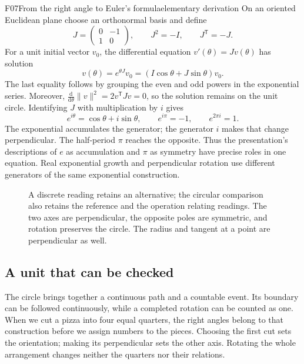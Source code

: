 \documentclass[11pt,a4paper]{article}
\begin{document}
\begin{formal}{F07}{From the right angle to Euler's formula}{elementary derivation}
On an oriented Euclidean plane choose an orthonormal basis and define
\begin{equation}
 J=\begin{pmatrix}0&-1\\1&0\end{pmatrix},\qquad
 J^2=-I,\qquad J^\mathsf{T}=-J.
\end{equation}
For a unit initial vector $v_0$, the differential equation
$v'(\theta)=Jv(\theta)$ has solution
\begin{equation}\label{eq:euler}
 v(\theta)=e^{\theta J}v_0
 = (I\cos\theta+J\sin\theta)v_0.
\end{equation}
The last equality follows by grouping the even and odd powers in the
exponential series. Moreover,
$\frac{\mathrm d}{\mathrm d\theta}\|v\|^2
=2v^\mathsf{T}Jv=0$, so the solution remains on the unit circle.
Identifying $J$ with multiplication by $i$ gives
\begin{equation}
 e^{i\theta}=\cos\theta+i\sin\theta,\qquad
 e^{i\pi}=-1,\qquad e^{2\pi i}=1.
\end{equation}
The exponential accumulates the generator; the generator $i$ makes that
change perpendicular. The half-period $\pi$ reaches the opposite. Thus the
presentation's descriptions of $e$ as accumulation and $\pi$ as symmetry have
precise roles in one equation. Real exponential growth and perpendicular
rotation use different generators of the same exponential construction.
\end{formal}

\begin{figure}[htbp]
\centering

\caption{A discrete reading retains an alternative; the circular comparison
also retains the reference and the operation relating readings. The two axes
are perpendicular, the opposite poles are symmetric, and rotation preserves
the circle. The radius and tangent at a point are perpendicular as well.}
\label{fig:unit}
\end{figure}

\subsection{A unit that can be checked}
The circle brings together a continuous path and a countable event. Its
boundary can be followed continuously, while a completed rotation can be
counted as one. When we cut a pizza into four equal quarters, the right angles
belong to that construction before we assign numbers to the pieces. Choosing
the first cut sets the orientation; making its perpendicular sets the other
axis. Rotating the whole arrangement changes neither the quarters nor their
relations.
\end{document}

